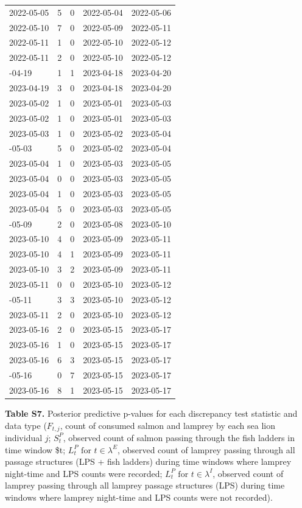 \documentclass[
]{article}
\begin{document}
\begin{longtable}{lrrll}
2022-05-05 & 5 & 0 & 2022-05-04 & 2022-05-06\\
2022-05-10 & 7 & 0 & 2022-05-09 & 2022-05-11\\
2022-05-11 & 1 & 0 & 2022-05-10 & 2022-05-12\\
2022-05-11 & 2 & 0 & 2022-05-10 & 2022-05-12\\
\addlinespace
2023-04-19 & 1 & 1 & 2023-04-18 & 2023-04-20\\
2023-04-19 & 3 & 0 & 2023-04-18 & 2023-04-20\\
2023-05-02 & 1 & 0 & 2023-05-01 & 2023-05-03\\
2023-05-02 & 1 & 0 & 2023-05-01 & 2023-05-03\\
2023-05-03 & 1 & 0 & 2023-05-02 & 2023-05-04\\
\addlinespace
2023-05-03 & 5 & 0 & 2023-05-02 & 2023-05-04\\
2023-05-04 & 1 & 0 & 2023-05-03 & 2023-05-05\\
2023-05-04 & 0 & 0 & 2023-05-03 & 2023-05-05\\
2023-05-04 & 1 & 0 & 2023-05-03 & 2023-05-05\\
2023-05-04 & 5 & 0 & 2023-05-03 & 2023-05-05\\
\addlinespace
2023-05-09 & 2 & 0 & 2023-05-08 & 2023-05-10\\
2023-05-10 & 4 & 0 & 2023-05-09 & 2023-05-11\\
2023-05-10 & 4 & 1 & 2023-05-09 & 2023-05-11\\
2023-05-10 & 3 & 2 & 2023-05-09 & 2023-05-11\\
2023-05-11 & 0 & 0 & 2023-05-10 & 2023-05-12\\
\addlinespace
2023-05-11 & 3 & 3 & 2023-05-10 & 2023-05-12\\
2023-05-11 & 2 & 0 & 2023-05-10 & 2023-05-12\\
2023-05-16 & 2 & 0 & 2023-05-15 & 2023-05-17\\
2023-05-16 & 1 & 0 & 2023-05-15 & 2023-05-17\\
2023-05-16 & 6 & 3 & 2023-05-15 & 2023-05-17\\
\addlinespace
2023-05-16 & 0 & 7 & 2023-05-15 & 2023-05-17\\
2023-05-16 & 8 & 1 & 2023-05-15 & 2023-05-17\\
\bottomrule
\end{longtable}

\newpage

\textbf{Table S7.} Posterior predictive p-values for each discrepancy
test statistic and data type (\(F_{t,j}\), count of consumed salmon and
lamprey by each sea lion individual \(j\); \(S_t^P\), observed count of
salmon passing through the fish ladders in time window \$t;
\(L_t^P \text{ for } t \in \lambda^E\), observed count of lamprey
passing through all passage structures (LPS + fish ladders) during time
windows where lamprey night-time and LPS counts were recorded;
\(L_t^P \text{ for } t \in \lambda^I\), observed count of lamprey
passing through all lamprey passage structures (LPS) during time windows
where lamprey night-time and LPS counts were not recorded).
\end{document}
